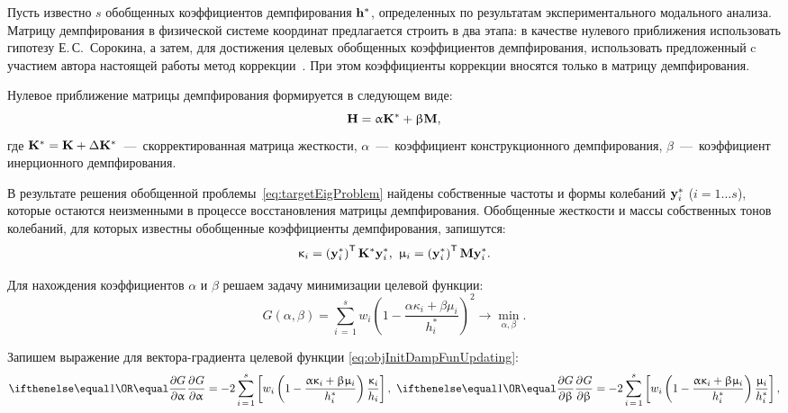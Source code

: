 Пусть известно $ s $ обобщенных коэффициентов демпфирования $ \mathbf{h} ^ \ast $, определенных по результатам экспериментального модального анализа. Матрицу демпфирования в физической системе координат предлагается строить в два этапа: в качестве нулевого приближения использовать гипотезу Е.\,С.~Сорокина, а затем, для достижения целевых обобщенных коэффициентов демпфирования, использовать предложенный c участием автора настоящей работы метод коррекции~\cite{lib:author:shortUpdating}. При этом коэффициенты коррекции вносятся только в матрицу демпфирования.

Нулевое приближение матрицы демпфирования формируется в следующем виде:
\begin{equation}
	\mathbf{H} = \upalpha \mathbf{K} ^ \ast + \upbeta \mathbf{M},
\end{equation}
где $ \mathbf{K} ^ \ast = \mathbf{K} + \Delta \mathbf{K} ^ \ast $~---~скорректированная матрица жесткости, $ \alpha $~---~коэффициент конструкционного демпфирования, $ \beta $~---~коэффициент инерционного демпфирования.

В результате решения обобщенной проблемы~\eqref{eq:targetEigProblem} найдены собственные частоты и формы колебаний $ \mathbf{y}_i ^ \ast $ ($ i = 1 \hdots s $), которые остаются неизменными в процессе восстановления матрицы демпфирования. Обобщенные жесткости и массы собственных тонов колебаний, для которых известны обобщенные коэффициенты демпфирования, запишутся:
\begin{equation}
	\upkappa_i = \left( \mathbf{y}_i ^ \ast \right) ^ \mathsf{T} \mathbf{K} ^ \ast \mathbf{y}_i ^ \ast, \
	\upmu_i = \left( \mathbf{y}_i ^ \ast \right) ^ \mathsf{T} \mathbf{M} \mathbf{y}_i ^ \ast.
\end{equation}

Для нахождения коэффициентов $ \alpha $ и $ \beta $ решаем задачу минимизации целевой функции:
\begin{equation}
	G(\alpha, \beta) = \sum \limits_{i\,=\,1} ^ s w_i \left( 1 - \frac{\alpha \kappa_i + \beta \mu_i}{h_i ^ \ast} \right)^2 \rightarrow \min_{\alpha, \beta}.
	\label{eq:objInitDampFunUpdating}
\end{equation}

Запишем выражение для вектора-градиента целевой функции \eqref{eq:objInitDampFunUpdating}:
\begin{equation*}
	\partDer{G}{\alpha}{} = -2 \sum_{i\,=\,1} ^ s \sbrackets{w_i \rbrackets{1 - \frac{\alpha \kappa_i + \beta \mu_i}{h_i ^ \ast}} \frac{\kappa_i}{h_i}}, \
	 \partDer{G}{\beta}{} = -2 \sum_{i\,=\,1} ^ s \sbrackets{w_i \rbrackets{1 - \frac{\alpha \kappa_i + \beta \mu_i}{h_i ^ \ast}} \frac{\mu_i}{h_i ^ \ast}},
\end{equation*}

